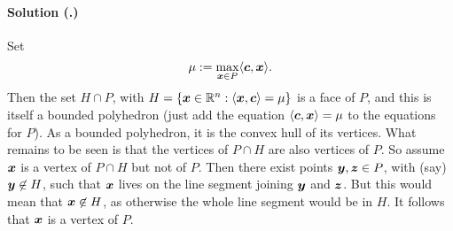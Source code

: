 \documentclass{article}
\newcounter{problemSheetNumber}
\newcounter{problems}
\renewcommand{\solution}[1]{\paragraph{Solution (\theproblemSheetNumber.\theproblems)}\addtocounter{problems}{1}\label{#1}}
\begin{document}
\solution{pr2} Set
\begin{equation*}
 \mu := \max_{\bm{x}\in P} \langle {\bm{c}}, {\bm{x}} \rangle.
\end{equation*}
Then the set $H\cap P$, with $H=\{\bm{x}\in \mathbb{R}^n\mathrel{\mathop{:}} \langle {\bm{x}}, {\bm{c}} \rangle=\mu\}$ is a face of $P$, and this is itself a bounded polyhedron (just add the equation $\langle {\bm{c}}, {\bm{x}} \rangle=\mu$ to the equations for $P$). As a bounded polyhedron, it is the convex hull of its vertices. What remains to be seen is that the vertices of $P\cap H$ are also vertices of $P$. 
So assume $\bm{x}$ is a vertex of $P\cap H$ but not of $P$. Then there exist points $\bm{y},\bm{z}\in P$, with (say) $\bm{y}\not\in H$, such that $\bm{x}$ lives on the line segment joining $\bm{y}$ and $\bm{z}$. But this would mean that $\bm{x}\not\in H$, as otherwise the whole line segment would be in $H$. It follows that $\bm{x}$ is a vertex of $P$.
\end{document}
